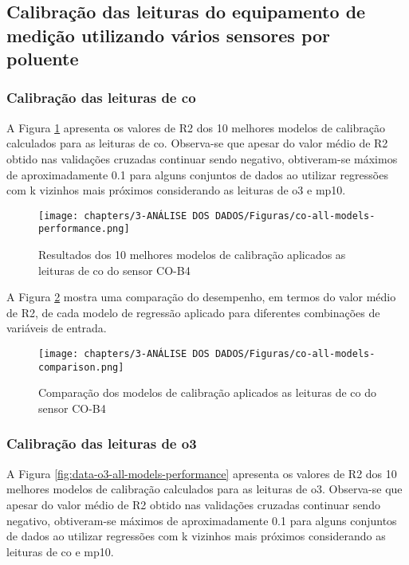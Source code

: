 
\subsection{Calibração das leituras do equipamento de medição utilizando vários sensores por poluente}

\subsubsection{Calibração das leituras de \acrshort{co}}

A Figura \ref{fig:data-co-all-models-performance} apresenta os valores de R2 dos 10 melhores modelos de calibração calculados para as leituras de \acrshort{co}. Observa-se que apesar do valor médio de R2 obtido nas validações cruzadas continuar sendo negativo, obtiveram-se máximos de aproximadamente 0.1 para alguns conjuntos de dados ao utilizar regressões com k vizinhos mais próximos considerando as leituras de \acrshort{o3} e \acrshort{mp10}.

\begin{figure}[h]
    \centering
    \caption{Resultados dos 10 melhores modelos de calibração aplicados as leituras de \acrshort{co} do sensor CO-B4}
    \texttt{[image: chapters/3-ANÁLISE DOS DADOS/Figuras/co-all-models-performance.png]}
    \label{fig:data-co-all-models-performance}
\end{figure}

A Figura \ref{fig:data-co-all-models-comparison} mostra uma comparação do desempenho, em termos do valor médio de R2, de cada modelo de regressão aplicado para diferentes combinações de variáveis de entrada.

\begin{figure}[h]
    \centering
    \caption{Comparação dos modelos de calibração aplicados as leituras de \acrshort{co} do sensor CO-B4}
    \texttt{[image: chapters/3-ANÁLISE DOS DADOS/Figuras/co-all-models-comparison.png]}
    \label{fig:data-co-all-models-comparison}
\end{figure}

\subsubsection{Calibração das leituras de \acrshort{o3}}

A Figura \ref{fig:data-o3-all-models-performance} apresenta os valores de R2 dos 10 melhores modelos de calibração calculados para as leituras de \acrshort{o3}. Observa-se que apesar do valor médio de R2 obtido nas validações cruzadas continuar sendo negativo, obtiveram-se máximos de aproximadamente 0.1 para alguns conjuntos de dados ao utilizar regressões com k vizinhos mais próximos considerando as leituras de \acrshort{co} e \acrshort{mp10}.

